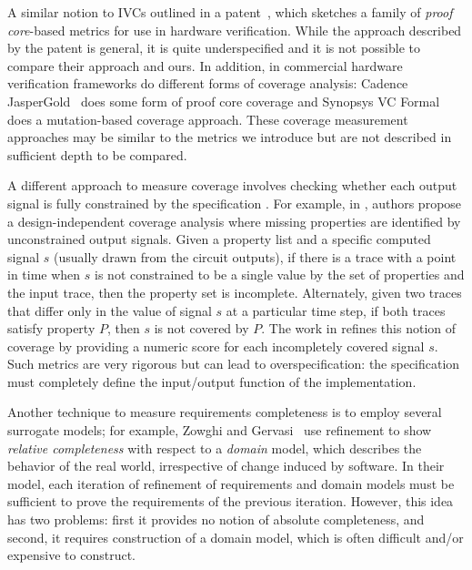
A similar notion to IVCs outlined in a patent~\cite{hanna2015formal}, which sketches a family of {\em proof core}-based metrics for use in hardware verification.  While the approach described by the patent is general, it is quite underspecified and it is not possible to compare their approach and ours. In addition, in commercial hardware verification frameworks do different forms of coverage analysis: Cadence JasperGold~\cite{jasper_gold} does some form of proof core coverage and Synopsys VC Formal~\cite{Synopsys_VC_formal} does a mutation-based coverage approach.  These coverage measurement approaches may be similar to the metrics we introduce but are not described in sufficient depth to be compared.

A different approach to measure coverage involves checking whether each output signal is fully constrained by the specification \cite{das2005formal, claessen2007coverage, grosse2007estimating}. For example, in \cite{claessen2007coverage}, authors propose a design-independent coverage analysis where missing properties are identified by unconstrained output signals. Given a property list and a specific computed signal $s$ (usually drawn from the circuit outputs), if there is a trace with a point in time when $s$ is not constrained to be a single value by the set of properties and the input trace, then the property set is incomplete. Alternately, given two traces that differ only in the value of signal $s$ at a particular time step, if both traces satisfy property $P$, then $s$ is not covered by $P$.
 The work in \cite{haedicke2012guiding} refines this notion of coverage by providing a numeric score for each incompletely covered signal $s$.  Such metrics are very rigorous but can lead to overspecification: the specification must completely define the input/output function of the implementation.


Another technique to measure requirements completeness is to employ several surrogate models; for example, Zowghi and Gervasi~\cite{zowghi2003three} use refinement to show {\em relative completeness} with respect to a {\em domain} model, which describes the behavior of the real world, irrespective of change induced by software.  In their model, each iteration of refinement of requirements and domain models must be sufficient to prove the requirements of the previous iteration.  However, this idea has two problems: first it provides no notion of absolute completeness, and second, it requires construction of a domain model, which is often difficult and/or expensive to construct.

